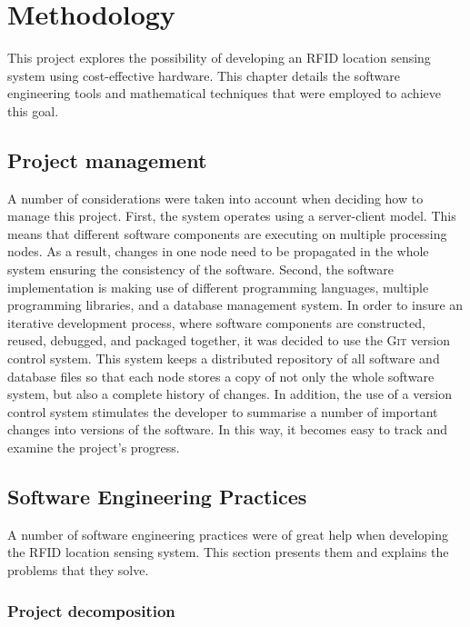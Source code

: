 \chapter{Methodology}
\label{ch:methodology}

This project explores the possibility of developing an RFID location sensing system using cost-effective hardware. This chapter details the software engineering tools and mathematical techniques that were employed to achieve this goal.

\section{Project management}

A number of considerations were taken into account when deciding how to manage this project. First, the system operates using a server-client model. This means that different software components are executing on multiple processing nodes. As a result, changes in one node need to be propagated in the whole system ensuring the consistency of the software.  Second, the software implementation is making use of different programming languages, multiple programming libraries, and a database management system. In order to insure an iterative development process, where software components are constructed, reused, debugged, and packaged together, it was decided to use the \textsc{Git} version control system. This system keeps a distributed repository of all software and database files so that each node stores a copy of not only the whole software system, but also a complete history of changes. In addition, the use of a version control system stimulates the developer to summarise a number of important changes into versions of the software. In this way, it becomes easy to track and examine the project's progress.


\section{Software Engineering Practices}

A number of software engineering practices were of great help when developing the RFID location sensing system. This section presents them and explains the problems that they solve.  

\subsection{Project decomposition}

